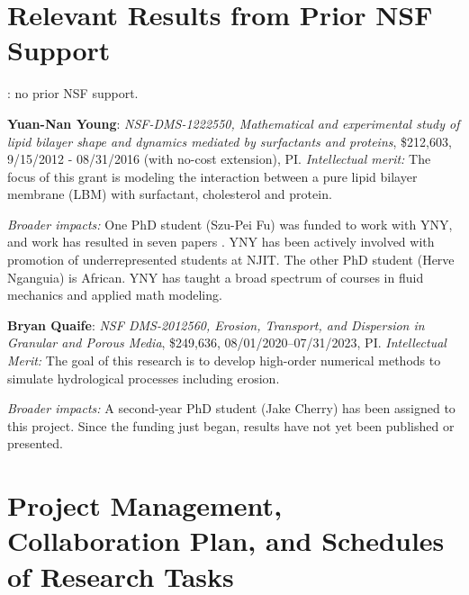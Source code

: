 \section{Relevant Results from Prior NSF Support}
: no prior NSF support.

\noindent
{\bf Yuan-Nan Young}: {\it NSF-DMS-1222550, Mathematical and experimental study of lipid bilayer 
shape and dynamics mediated by surfactants and proteins}, \$212,603, 9/15/2012 - 08/31/2016 (with no-cost extension), PI. 
{\it Intellectual merit:} The focus of this grant is modeling the interaction between a pure lipid bilayer membrane (LBM) with surfactant, cholesterol and protein.


\noindent
{\it Broader impacts:} 
One PhD student (Szu-Pei Fu) was funded to work with YNY, and work has
resulted in seven papers
\cite{Nganguia2013_PoF,Nganguia2013_PRE,Young2014_JFM,Young2015_PoF,Nganguia2015_CiCP,Pak2015_PNAS,fu2015pre}.
YNY has been actively involved with promotion of underrepresented
students at NJIT.  The other PhD student (Herve Nganguia) is African.
YNY has taught a broad spectrum of courses in fluid mechanics and
applied math modeling.

\noindent
{\bf Bryan Quaife}: {\em NSF DMS-2012560, Erosion, Transport, and
Dispersion in Granular and Porous Media}, \$249,636,
08/01/2020--07/31/2023, PI. {\em Intellectual Merit:} The goal of this
research is to develop high-order numerical methods to
simulate hydrological processes including erosion.

\noindent
{\it Broader impacts:} 
A second-year PhD student (Jake Cherry) has been assigned to this
project. Since the funding just began, results have not yet
been published or presented. 

\section{Project Management, Collaboration Plan, and Schedules of
Research Tasks}
\setlength{\parindent}{0pt}

